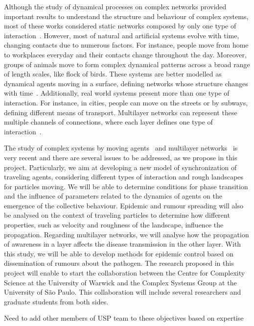 Although the study of dynamical processes on complex networks provided 
important results to understand the structure and behaviour of complex systems, 
most of these works considered static networks composed by only one type of 
interaction~\cite{Costa011, Barabasi016}. However, most of natural and 
artificial systems evolve with time, changing contacts due to numerous factors. 
For instance, people move from home to workplaces everyday and their contacts 
change throughout the day. Moreover, groups of animals move to form complex 
dynamical patterns across a broad range of length scales, like flock of birds. 
These systems are better modelled as dynamical agents moving in a surface, 
defining networks whose structure changes with time~\cite{Buscarino08, 
Levis017}.  Additionally, real world systems present more than one type of 
interaction. For instance, in cities, people can move on the streets or by 
subways, defining different means of transport.  Multilayer networks can 
represent these multiple channels of connections, where each layer defines one 
type of interaction~\cite{Kivela014, Boccaletti014}. 

The study of complex systems by moving agents~\cite{Levis017} and multilayer 
networks~\cite{Kivela014} is very recent and there are several issues to be 
addressed, as we propose in this project. Particularly, we aim at developing a 
new model of synchronization of traveling agents, considering different types 
of interaction and rough landscapes for particles moving. We will be able to 
determine conditions for phase transition and the influence of parameters 
related to the dynamics of agents on the emergence of the collective behaviour. 
Epidemic and rumour spreading will also be analysed on the context of traveling 
particles to determine how different properties, such as velocity and roughness 
of the landscape, influence the propagation. Regarding multilayer networks, we 
will analyse how the propagation of awareness in a layer affects the disease 
transmission in the other layer. With this study, we will be able to develop 
methods for epidemic control based on dissemination of rumours about the 
pathogen. The research proposed in this project will enable to start the 
collaboration between the Centre for Complexity Science at the University of 
Warwick and the Complex Systems Group at the University of S\~{a}o Paulo. This 
collaboration will include several researchers and graduate students from both 
sides.

{\color{red} Need to add other members of USP team to these objectives based on 
expertise}

